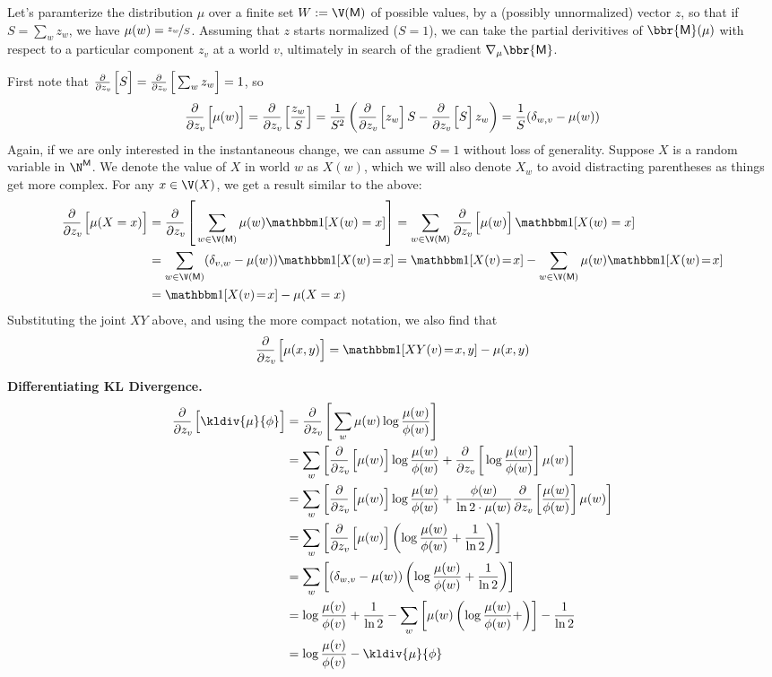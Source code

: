 \documentclass{article}
\newcommand{\sfM}{\mathsf M}
\begin{document}
	\def\pz#1{\frac{\partial}{\partial z_v\!}\left[\vphantom{\Big|}#1\right]}
	Let's paramterize the distribution $\mu$ over a finite set $W := \V(\sfM)$ of possible values, by a (possibly unnormalized) vector $z$, so that if $S = \sum_{w} z_w$, we have $\mu(w) = \nicefrac{z_w}{S}$. Assuming that $z$ starts normalized ($S = 1$), we can take the partial derivitives of $\bbr{\sfM}(\mu)$ with respect to a particular component $z_v$ at a world $v$, ultimately in search of the gradient $\nabla_{\mu} \bbr{\sfM}$.

	First note that $\pz{S} = \pz{\sum_w z_w} = 1$, so
	\[ \pz{\mu(w)} = \pz{\frac{z_w}{S}}
		= \frac{1}{S^2} \left(\pz{z_w} {S} - \pz{S}z_w \right)
		= \frac{1}{S}(\delta_{w,v} - \mu(w))
	\]
	Again, if we are only interested in the instantaneous change, we can assume $S = 1$ without loss of generality.
	Suppose $X$ is a random variable in $\N^\sfM$. We denote the value of $X$ in world $w$ as $X(w)$, which we will also denote $X_w$ to avoid distracting parentheses as things get more complex. For any $x \in \V(X)$, we get a result similar to the above:
	\begin{align*} \pz{\mu(X = x)}
	  	&= \pz{\sum_{w \in \V(\sfM)} \mu(w) \mathbbm1[X(w) = x]}
	 	= \sum_{w \in \V(\sfM)} \pz{\mu(w)} \mathbbm1[X(w) = x] \\
	 	&= \sum_{w \in \V(\sfM)} (\delta_{v,w} - \mu(w)) \mathbbm1[X(w) \!=\! x]
	 	= \mathbbm1[X(v) \!=\! x] - \sum_{w \in \V(\sfM)} \mu(w) \mathbbm1[X(w) \!=\! x] \\
	 	&=  \mathbbm1[X(v) \!=\! x]  - \mu(X = x)
	\end{align*}
	Substituting the joint $XY$ above, and using the more compact notation, we also find that
	\[ \pz{\mu(x,y)} = \mathbbm1[XY(v) \!=\! x,y] - \mu(x,y) \]

	\textbf{Differentiating KL Divergence.}
	\begin{align*}
		\pz{\kldiv{\mu}{\phi}} &= \pz{\sum_w \mu(w) \log \frac{\mu(w)}{\phi(w)}} \\
			&= \sum_w \left[ \pz{\mu(w)} \log \frac{\mu(w)}{\phi(w)} + \pz{\log\frac{\mu(w)}{\phi(w)} }\mu(w) \right] \\
			&=\sum_w \left[ \pz{\mu(w)} \log \frac{\mu(w)}{\phi(w)} + \frac{\phi(w)}{\ln 2\cdot\mu(w)} \pz{\frac{\mu(w)}{\phi(w)}} \mu(w) \right] \\
			&=\sum_w \left[ \pz{\mu(w)} \left(\log \frac{\mu(w)}{\phi(w)} + \frac{1}{\ln 2} \right) \right] \\
			&=\sum_w \left[ (\delta_{w,v} - \mu(w)) \left(\log \frac{\mu(w)}{\phi(w)} + \frac{1}{\ln 2} \right) \right] \\
			&= \log \frac{\mu(v)}{\phi(v)} + \frac{1}{\ln 2} - \sum_w \left[ \mu(w) \left(\log \frac{\mu(w)}{\phi(w)} +  \right) \right] - \frac{1}{\ln 2} \\
			&= \log \frac{\mu(v)}{\phi(v)} - \kldiv{\mu}{\phi} \\
	\end{align*}
\end{document}
